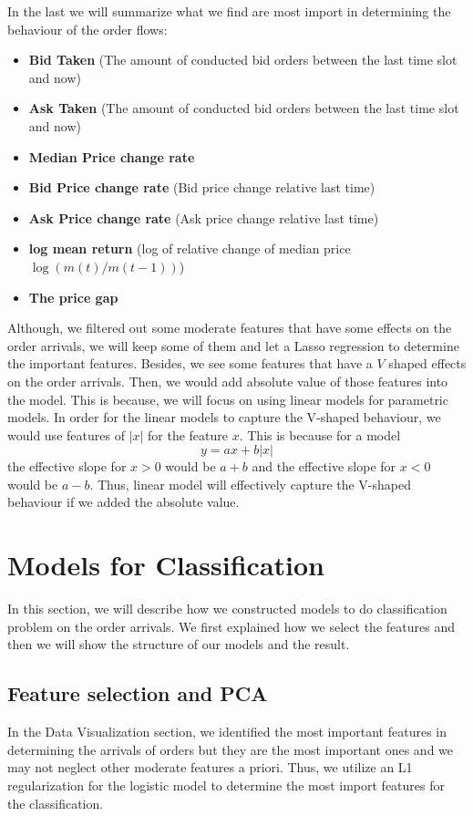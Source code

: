 \documentclass[letterpaper,12pt]{article}
\numberwithin{equation}{section}
\begin{document}
In the last we will summarize what we find are most import in determining the behaviour of the order flows:
\begin{itemize}
    \item \textbf{Bid Taken} (The amount of conducted bid orders between the last time slot and now)
    \item \textbf{Ask Taken} (The amount of conducted bid orders between the last time slot and now)
    \item \textbf{Median Price change rate}
    \item \textbf{Bid Price change rate} (Bid price change relative last time)
    \item \textbf{Ask Price change rate} (Ask price change relative last time)
    \item \textbf{log mean return} (log of relative change of median price $\log(m(t)/m(t-1))$)
    \item \textbf{The price gap} 
\end{itemize}
Although, we filtered out some moderate features that have some effects on the order arrivals, we will keep some of them and let a Lasso regression to determine the important features. Besides, we see some features that have a $V$ shaped effects on the order arrivals. Then, we would add absolute value of those features into the model. This is because, we will focus on using linear models for parametric models. In order for the linear models to capture the V-shaped behaviour, we would use features of $|x|$ for the feature $x$. This is because for a model 
\begin{equation}
    y = ax + b|x|
\end{equation}
the effective slope for $x>0$ would be $a+b$ and the effective slope for $x<0$ would be $a-b$. Thus, linear model will effectively capture the V-shaped behaviour if we added the absolute value. 

\section{Models for Classification}
In this section, we will describe how we constructed models to do classification problem on the order arrivals. We first explained how we select the features and then we will show the structure of our models and the result. 
\subsection{Feature selection and PCA}
In the Data Visualization section, we identified the most important features in determining the arrivals of orders but they are the most important ones and we may not neglect other moderate features a priori. Thus, we utilize an L1 regularization for the logistic model to determine the most import features for the classification. 
\end{document}
